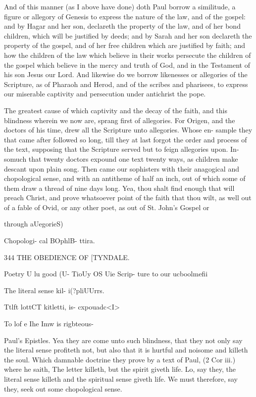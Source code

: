 \documentclass{custom}
\begin{document}
{And of this manner (as I above have done) doth Paul 
borrow a similitude, a figure or allegory of Genesis to 
express the nature of the law, and of the gospel: and by 
Hagar and her son, declareth the property of the law, and
of her bond children, which will be justified by deeds;
and by Sarah and her son declareth the property of the 
gospel, and of her free children which are justified by faith; 
and how the children of the law which believe in their 
works persecute the children of the gospel which believe 
in the mercy and truth of God, and in the Testament of 
his son Jesus our Lord. And likewise do we borrow 
likenesses or allegories of the Scripture, as of Pharaoh 
and Herod, and of the scribes and pharisees, to express our 
miserable captivity and persecution under antichrist the pope. 

The greatest cause of which captivity and the decay of 
the faith, and this blindness wherein we now are, sprang
first of allegories. For Origen, and the doctors of his
time, drew all the Scripture unto allegories. Whose en- 
sample they that came after followed so long, till they at 
last forgot the order and process of the text, supposing 
that the Scripture served but to feign allegories upon. In- 
somuch that twenty doctors expound one text twenty ways, 
as children make descant upon plain song. Then came 
our sophisters with their anagogical and chopological sense, 
and with an antitheme of half an inch, out of which some 
of them draw a thread of nine days long. Yea, thou shalt 
find enough that will preach Christ, and prove whatsoever 
point of the faith that thou wilt, as well out of a fable of 
Ovid, or any other poet, as out of St. John's Gospel or 

through 
aUegorieS) 

Chopologi- 
cal BOphlB- 
ttira. 


344
THE OBEDIENCE OF
[TYNDALE.

Poetry U 
lu good (U- 
TioUy OS 
Uie Scrip- 
ture to our 
ucboolmefii 

The literal 
sense kil- 
i(?pliUUrrs. 

Ttlft lottCT 
kitletti, is- 
cxpouadc<I> 

To lof e 
Ihe Imw is 
rigbteous- 

Paul's Epistles. Yea they are come unto such blindness, 
that they not only say the literal sense profiteth not, but 
also that it is hurtful and noisome and killeth the soul. 
Which damnable doctrine they prove by a text of Paul, 
(2 Cor iii.) where he saith, The letter killeth, but the 
spirit giveth life. Lo, say they, the literal sense killeth 
and the spiritual sense giveth life. We must therefore, 
say they, seek out some chopological sense. 

}
\end{document}
